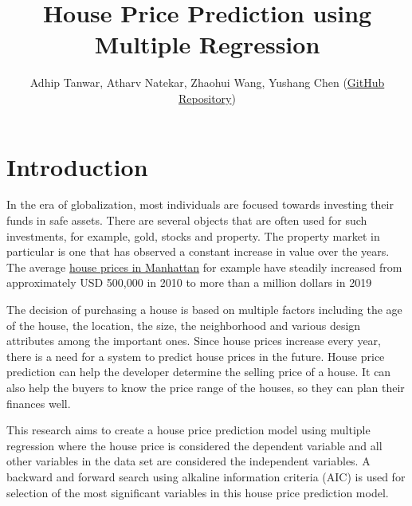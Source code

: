 \documentclass[letterpaper,9pt,twocolumn,twoside,]{pinp}
\title{House Price Prediction using Multiple Regression}
\author[]{Adhip Tanwar, Atharv Natekar, Zhaohui Wang, Yushang Chen
(\href{https://github.sydney.edu.au/atan6081/LAB-07-RE_none_2}{GitHub
Repository})}
\begin{document}
\verticaladjustment{-2pt}

\maketitle
\thispagestyle{firststyle}



\hypertarget{introduction}{%
\section{Introduction}\label{introduction}}

In the era of globalization, most individuals are focused towards
investing their funds in safe assets. There are several objects that are
often used for such investments, for example, gold, stocks and property.
The property market in particular is one that has observed a constant
increase in value over the years. The average
\href{https://ny.curbed.com/2019/12/13/21009872/nyc-home-value-2010s-manhattan-apartments}{house
prices in Manhattan} for example have steadily increased from
approximately USD 500,000 in 2010 to more than a million dollars in 2019

The decision of purchasing a house is based on multiple factors
including the age of the house, the location, the size, the neighborhood
and various design attributes among the important ones. Since house
prices increase every year, there is a need for a system to predict
house prices in the future. House price prediction can help the
developer determine the selling price of a house. It can also help the
buyers to know the price range of the houses, so they can plan their
finances well.

This research aims to create a house price prediction model using
multiple regression where the house price is considered the dependent
variable and all other variables in the data set are considered the
independent variables. A backward and forward search using alkaline
information criteria (AIC) is used for selection of the most significant
variables in this house price prediction model.
\end{document}
